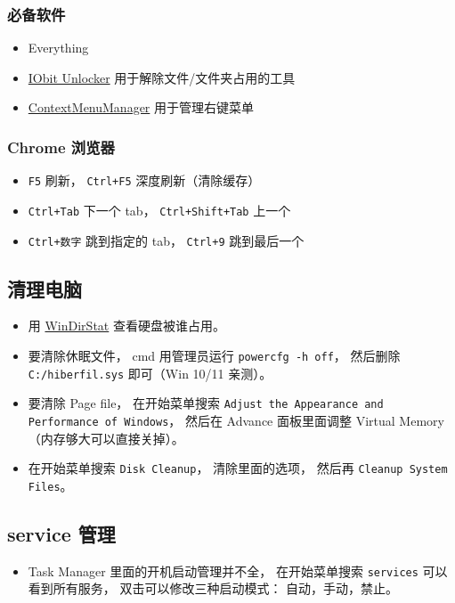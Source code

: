 \subsubsection{必备软件}
\begin{itemize}
\item Everything
\item \href{https://www.iobit.com/en/iobit-unlocker.php}{IObit Unlocker} 用于解除文件/文件夹占用的工具
\item \href{https://github.com/BluePointLilac/ContextMenuManager}{ContextMenuManager} 用于管理右键菜单
\end{itemize}

\subsubsection{Chrome 浏览器}
\begin{itemize}
\item \verb`F5` 刷新， \verb`Ctrl+F5` 深度刷新（清除缓存）
\item \verb`Ctrl+Tab` 下一个 tab， \verb`Ctrl+Shift+Tab` 上一个
\item \verb`Ctrl+数字` 跳到指定的 tab， \verb`Ctrl+9` 跳到最后一个
\end{itemize}


\subsection{清理电脑}
\begin{itemize}
\item 用 \href{https://windirstat.net/}{WinDirStat} 查看硬盘被谁占用。
\item 要清除休眠文件， cmd 用管理员运行 \verb`powercfg -h off`， 然后删除 \verb`C:/hiberfil.sys` 即可（Win 10/11 亲测）。
\item 要清除 Page file， 在开始菜单搜索 \verb`Adjust the Appearance and Performance of Windows`， 然后在 Advance 面板里面调整 Virtual Memory（内存够大可以直接关掉）。
\item 在开始菜单搜索 \verb`Disk Cleanup`， 清除里面的选项， 然后再 \verb`Cleanup System Files`。
\end{itemize}

\subsection{service 管理}
\begin{itemize}
\item Task Manager 里面的开机启动管理并不全， 在开始菜单搜索 \verb`services` 可以看到所有服务， 双击可以修改三种启动模式： 自动，手动，禁止。
\end{itemize}


